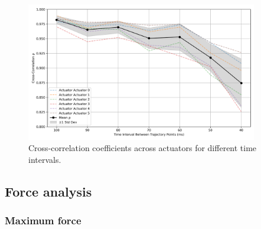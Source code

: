 \begin{figure}[H]
    \centering
    \includegraphics[width=0.9\textwidth]{figures/actuator_rhos.png}
    \caption{Cross-correlation coefficients across actuators for different time intervals.}
    \label{fig:actuator_rhos_2}
\end{figure}

\subsection{Force analysis}

\subsubsection{Maximum force}

